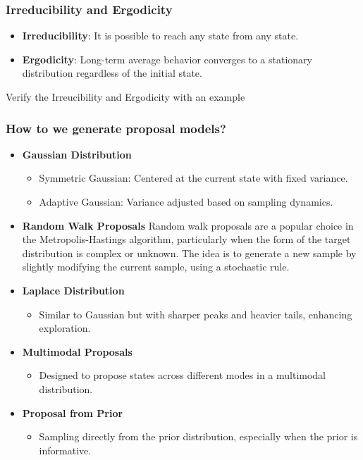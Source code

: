 \documentclass[aspectratio=169]{beamer}
\begin{document}
\begin{frame}
\frametitle{Irreducibility and Ergodicity}
\begin{itemize}
    \item \textbf{Irreducibility}: It is possible to reach any state from any state.
    \item \textbf{Ergodicity}: Long-term average behavior converges to a stationary distribution regardless of the initial state.
\end{itemize}
\end{frame}

\begin{frame}
\LARGE Verify the Irreucibility and Ergodicity with an example 
    
\end{frame}

\begin{frame}
\frametitle{How to we generate proposal models?}

\begin{itemize}
  \item \textbf{Gaussian Distribution}
  \begin{itemize}
    \item Symmetric Gaussian: Centered at the current state with fixed variance.
    \item Adaptive Gaussian: Variance adjusted based on sampling dynamics.
  \end{itemize}

  \item \textbf{Random Walk Proposals}
  Random walk proposals are a popular choice in the Metropolis-Hastings algorithm, particularly when the form of the target distribution is complex or unknown.  The idea is to generate a new sample by slightly modifying the current sample, using a stochastic rule.

  \item \textbf{Laplace Distribution}
  \begin{itemize}
    \item Similar to Gaussian but with sharper peaks and heavier tails, enhancing exploration.
  \end{itemize}

  \item \textbf{Multimodal Proposals}
  \begin{itemize}
    \item Designed to propose states across different modes in a multimodal distribution.
  \end{itemize}

  \item \textbf{Proposal from Prior}
  \begin{itemize}
    \item Sampling directly from the prior distribution, especially when the prior is informative.
  \end{itemize}
\end{itemize}

\end{frame} 
\end{document}
